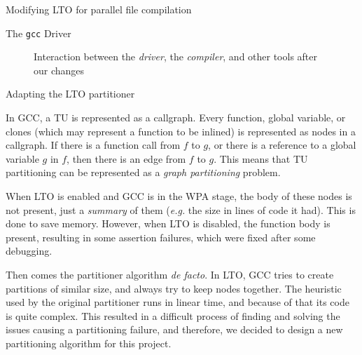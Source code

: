\begin{section}{Modifying LTO for parallel file compilation}
\begin{subsection}{The \texttt{gcc} Driver}
\begin{figure}
{{
}
}%
\caption{Interaction between the \textit{driver}, the \textit{compiler}, and other tools
after our changes}
\label{fig:gnu_toolchain_patched}
\end{figure}

\end{subsection}

\begin{subsection}{Adapting the LTO partitioner}\label{sec:lto_partitioner}

In GCC, a TU is represented as a callgraph. Every function, global variable, or
clones (which may represent a function to be inlined) is represented as nodes
in a callgraph. If there is a function call from $f$ to $g$, or there is a
reference to a global variable $g$ in $f$, then there is an edge from $f$ to
$g$. This means that TU partitioning can be represented as a \emph{graph
partitioning} problem.

When LTO is enabled and GCC is in the WPA stage, the body of these nodes
is not present, just a \textit{summary} of them (\textit{e.g.} the size
in lines of code it had). This is done to save memory. However,
when LTO is disabled, the function body is present, resulting
in some assertion failures, which were fixed after some debugging.

Then comes the partitioner algorithm \textit{de facto}. In LTO, GCC tries to
create partitions of similar size, and always try to keep nodes together. The
heuristic used by the original partitioner runs in linear time, and because of
that its code is quite complex. This resulted in a difficult process of finding
and solving the issues causing a partitioning failure, and therefore, we
decided to design a new partitioning algorithm for this project.


\end{subsection}
\end{section}
